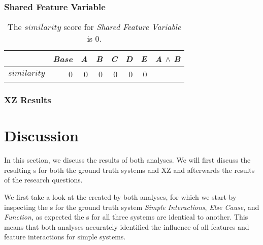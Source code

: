 \subsubsection*{Shared Feature Variable} %

\begin{table}[H]
    \centering
    \begin{tabular}{lrrrrrrr}    \toprule
               & \emph{Base} & \emph{A} & \emph{B} & \emph{C} & \emph{D} & \emph{E} & \emph{A} $\land$ \emph{B}   \\ \midrule
    $similarity$ & 0 & 0 & 0 & 0 & 0 & 0      \\ \bottomrule
    \end{tabular}
    \caption{The $\overline{similarity}$ score for \emph{Shared Feature Variable} is $0$.}
\end{table}

\subsubsection*{XZ Results}

\section{Discussion}\label{sec:discussion}

In this section, we discuss the results of both analyses. We will first discuss the resulting {\perfInfluenceModel}s 
for both the ground truth systems and \textsc{XZ} and afterwards the results of the research questions.

We first take a look at the {\perfInfluenceModel} created by both analyses, 
for which we start by inspecting the {\perfInfluenceModel}s for the ground truth system \emph{Simple Interactions}, 
\emph{Else Cause}, and \emph{Function}, as expected the {\perfInfluenceModel}s for all three systems are identical to another. 
This means that both analyses accurately identified the influence of all features and feature interactions for simple systems.

